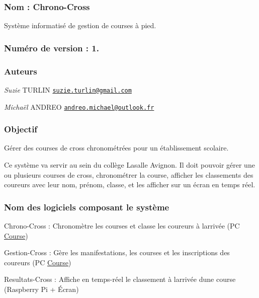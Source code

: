 \subsubsection*{Nom \+: Chrono-\/\+Cross}

Système informatisé de gestion de courses à pied.

\subsubsection*{Numéro de version \+: 1.}

\subsubsection*{Auteurs}

{\itshape Suzie} T\+U\+R\+L\+IN \href{mailto:suzie.turlin@gmail.com}{\tt suzie.\+turlin@gmail.\+com}

{\itshape Michaël} A\+N\+D\+R\+EO \href{mailto:andreo.michael@outlook.fr}{\tt andreo.\+michael@outlook.\+fr}

\subsubsection*{Objectif}

Gérer des courses de cross chronométrées pour un établissement scolaire.

Ce système va servir au sein du collège Lasalle Avignon. Il doit pouvoir gérer une ou plusieurs courses de cross, chronométrer la course, afficher les classements des coureurs avec leur nom, prénom, classe, et les afficher sur un écran en temps réel.

\subsubsection*{Nom des logiciels composant le système}


\begin{DoxyItemize}
\item Chrono-\/\+Cross \+: Chronomètre les courses et classe les coureurs à l\textquotesingle{}arrivée (PC \hyperlink{class_course}{Course})
\item Gestion-\/\+Cross \+: Gère les manifestations, les courses et les inscriptions des coureurs (PC \hyperlink{class_course}{Course})
\item Resultats-\/\+Cross \+: Affiche en temps-\/réel le classement à l\textquotesingle{}arrivée d\textquotesingle{}une course (Raspberry Pi + Écran)
\end{DoxyItemize}

